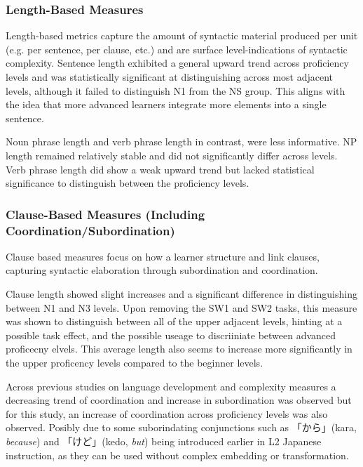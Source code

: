 \subsubsection{Length-Based Measures}

Length-based metrics capture the amount of syntactic material produced per unit (e.g. per sentence, per clause,
etc.) and are surface level-indications of syntactic complexity. Sentence length exhibited a general upward trend
across proficiency levels and was statistically significant at distinguishing across most adjacent levels, although
it failed to distinguish N1 from the NS group. This aligns
with
the idea that more advanced learners integrate more elements into a single sentence.

Noun phrase length and verb phrase length in contrast, were less informative. NP length remained relatively stable
and did not significantly differ across levels. Verb phrase length did show a weak upward trend but lacked
statistical significance to distinguish between the proficiency levels.

\subsubsection{Clause-Based Measures (Including Coordination/Subordination)}
Clause based measures focus on how a learner structure and link clauses, capturing syntactic elaboration through
subordination and coordination.

Clause length showed slight
increases and a significant difference in distinguishing between N1 and N3 levels. Upon removing the SW1 and SW2
tasks, this measure was shown to distinguish between all of the upper adjacent levels, hinting at a possible
task effect, and the possible useage to discriiniate between advanced proficecny elvels. This average length also
seems to increase more
significantly in the upper proficency levels compared
to the beginner levels.

Across previous studies on language development and complexity
measures a decreasing trend of coordination and increase in subordination was observed \citep{Vyatkina2012,} but for
this
study, an
increase of coordination across proficiency levels was also observed. Posibly due to some suborindating conjunctions
such as 「から」(kara, \textit{because}) and 「けど」(kedo, \textit{but}) being
introduced earlier in L2 Japanese instruction, as they can be used without complex embedding or transformation.

